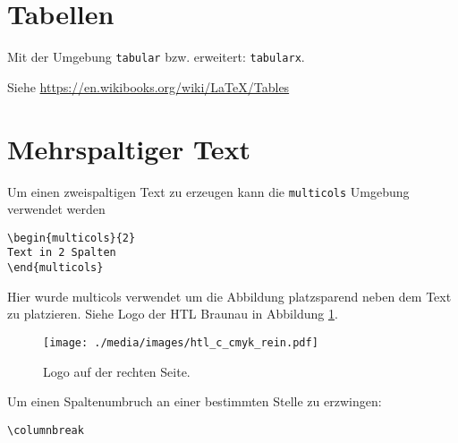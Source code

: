 \section{Tabellen}

Mit der Umgebung \lstinline{tabular} bzw. erweitert: \lstinline{tabularx}.

Siehe \url{https://en.wikibooks.org/wiki/LaTeX/Tables}


\section{Mehrspaltiger Text}

\begin{multicols}{2}

Um einen zweispaltigen Text zu erzeugen kann die \verb+multicols+ Umgebung verwendet werden

\begin{Verbatim}[frame=single]
\begin{multicols}{2}
Text in 2 Spalten
\end{multicols}
\end{Verbatim}

Hier wurde multicols verwendet um die Abbildung platzsparend neben dem Text zu platzieren.
Siehe Logo der HTL Braunau in Abbildung \ref{logoTwoCols}.


\columnbreak
\begin{figure}[H]
	\centering
	\texttt{[image: ./media/images/htl\_c\_cmyk\_rein.pdf]}
  	\caption{Logo auf der rechten Seite.}
  	\label{logoTwoCols}
\end{figure}

Um einen Spaltenumbruch an einer bestimmten Stelle zu erzwingen:
\begin{Verbatim}[frame=single]
\columnbreak
\end{Verbatim}


\end{multicols}


